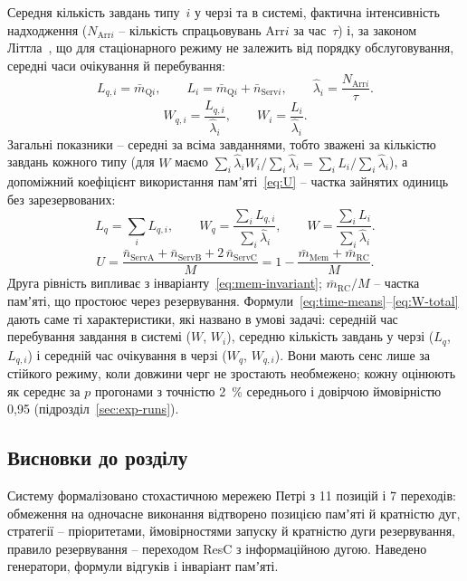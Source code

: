 Середня кількість завдань типу~$i$ у черзі та в системі, фактична інтенсивність надходження
($N_{\text{Arr}i}$ -- кількість спрацьовувань Arr$i$ за час~$\tau$) і, за законом
Літтла~\cite{kleinrock}, що для стаціонарного режиму не залежить від порядку обслуговування,
середні часи очікування й перебування:
\begin{equation}\label{eq:L-lambda}
  L_{q,i} = \bar m_{\text{Q}i}, \qquad
  L_i = \bar m_{\text{Q}i} + \bar n_{\text{Serv}i}, \qquad
  \hat\lambda_i = \frac{N_{\text{Arr}i}}{\tau}.
\end{equation}
\begin{equation}\label{eq:W-type}
  W_{q,i} = \frac{L_{q,i}}{\hat\lambda_i}, \qquad W_i = \frac{L_i}{\hat\lambda_i}.
\end{equation}
Загальні показники -- середні за всіма завданнями, тобто зважені за кількістю завдань кожного
типу (для $W$ маємо $\sum_i \hat\lambda_i W_i / \sum_i \hat\lambda_i = \sum_i L_i/\sum_i\hat\lambda_i$),
а допоміжний коефіцієнт використання памʼяті~\eqref{eq:U} -- частка зайнятих одиниць без
зарезервованих:
\begin{equation}\label{eq:W-total}
  L_q = \sum_{i} L_{q,i}, \qquad
  W_q = \frac{\sum_i L_{q,i}}{\sum_i \hat\lambda_i}, \qquad
  W = \frac{\sum_i L_i}{\sum_i \hat\lambda_i}.
\end{equation}
\begin{equation}\label{eq:U}
  U = \frac{\bar n_{\text{ServA}} + \bar n_{\text{ServB}} + 2\,\bar n_{\text{ServC}}}{M}
    = 1 - \frac{\bar m_{\text{Mem}} + \bar m_{\text{RC}}}{M}.
\end{equation}
Друга рівність випливає з інваріанту~\eqref{eq:mem-invariant}; $\bar m_{\text{RC}}/M$ -- частка
памʼяті, що простоює через резервування. Формули~\eqref{eq:time-means}--\eqref{eq:W-total} дають
саме ті характеристики, які названо в умові задачі: середній час перебування завдання в системі
($W$, $W_i$), середню кількість завдань у черзі ($L_q$, $L_{q,i}$) і середній час очікування в
черзі ($W_q$, $W_{q,i}$). Вони мають сенс лише за стійкого режиму, коли довжини черг не
зростають необмежено; кожну оцінюють як середнє
за $p$ прогонами з точністю 2~\% середнього і довірчою ймовірністю 0,95 (підрозділ~\ref{sec:exp-runs}).

\subsection{Висновки до розділу}

Систему формалізовано стохастичною мережею Петрі з 11 позицій і 7 переходів: обмеження на
одночасне виконання відтворено позицією памʼяті й кратністю дуг, стратегії -- пріоритетами,
ймовірностями запуску й кратністю дуги резервування, правило резервування -- переходом ResC з
інформаційною дугою. Наведено генератори, формули відгуків і інваріант памʼяті.
